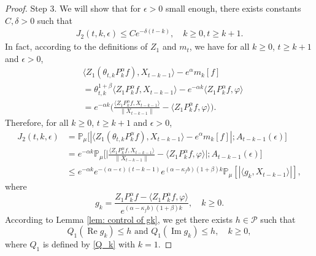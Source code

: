 \documentclass[12pt,a4paper]{amsart}
\theoremstyle{plain}
\theoremstyle{definition}
\numberwithin{equation}{section}
\begin{document}
\begin{proof}
    Step 3.
    We will show that for $\epsilon>0$ small enough, there exists constants $C, \delta>0$ such that
    \begin{equation}\begin{split}
    \label{eq:31step3}
      J_2(t,k,\epsilon)
      \leq Ce^{-\delta (t-k)},
      \quad k\geq 0, t\geq k+1.
    \end{split}\end{equation}
    In fact, according to the definitions of $Z_1$ and $m_t$, we have for all $k\geq 0$, $t\geq k+1$ and $\epsilon> 0$,
    \begin{equation}\begin{split}
          &\langle Z_1(\theta_{t,k}P^\alpha_k f),X_{t-k-1}\rangle-e^{\alpha}m_k[f]
          \\&= \theta_{t,k}^{1+\beta} \langle Z_1P^\alpha_k f,X_{t-k-1}\rangle - e^{-\alpha k}\langle  Z_1P^\alpha_k f,\varphi\rangle
          \\&=e^{-\alpha k}\Big(\frac{\langle Z_1P^\alpha_k f ,X_{t-k-1}\rangle}{\|X_{t-k-1}\|}-\langle  Z_1P^\alpha_k f ,\varphi\rangle\Big).
    \end{split}\end{equation}
Therefore, for all $k\geq 0$, $t\geq k+1$ and $\epsilon> 0$,
\begin{equation}\begin{split}
\label{eq: prevJ2}
J_2(t,k,\epsilon)&
    = \mathbb P_\mu\big[|\langle Z_1(\theta_{t,k}P^\alpha_k f),X_{t-k-1}\rangle-e^{\alpha}m_k[f]|;A_{t-k-1}(\epsilon)\big]
    \\&=e^{-\alpha k}\mathbb{P}_{\mu}\bigg[\Big|\frac{\langle Z_1P^{\alpha}_k f,X_{t-k-1}\rangle}{\|X_{t-k-1}\|}-\langle  Z_1P^{\alpha}_k f,\varphi\rangle\Big|;A_{t-k-1}(\epsilon)\bigg]\nonumber\\
    &\leq e^{-\alpha k}e^{-(\alpha-\epsilon)(t-k-1)}e^{(\alpha-\kappa_f b)(1+\beta)k} \mathbb{P}_{\mu}\left[\left|\langle g_k,X_{t-k-1}\rangle\right|\right],
\end{split}\end{equation}
where
\[
g_k
    = \frac{Z_1 P^{\alpha}_k f-\langle  Z_1P^{\alpha}_k f,\varphi\rangle}{e^{(\alpha-\kappa_f b)(1+\beta)k}},
    \quad k \geq 0.
\]
According to Lemma \ref{lem: control of gk}, we get there exists $h\in \mathcal{P}$ such that
 \[
    Q_1 (\operatorname{Re} g_k) \leq h
    \text{ and } Q_1 (\operatorname{Im} g_k)\leq h,
    \quad k \geq 0,
 \]
    where $Q_1$ is defined by \eqref{Q_k} with $k=1$.


\end{proof}
\end{document}

